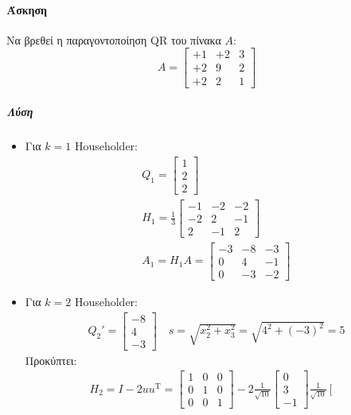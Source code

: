 \documentclass[11pt,a4paper,notitlepage,fleqn,final]{article}
\begin{document}
\paragraph{Άσκηση}
Να βρεθεί η παραγοντοποίηση QR του πίνακα \( A \):
\[
A = \left[\begin{matrix}
+1&+2&3\\+2&9&2\\+2&2&1
\end{matrix}\right]
\]
\subparagraph{Λύση}
\begin{itemize}
	\item Για \( k=1 \) Householder:
	\begin{gather*}
		Q_1 = \left[\begin{matrix}
		1\\2\\2
		\end{matrix}\right] \\
		H_1 = \frac{1}{3} \left[\begin{matrix}
		-1&-2&-2\\-2&2&-1\\2&-1&2
		\end{matrix}\right] \\
		A_1 = H_1A = \left[\begin{matrix}
		-3 & -8 & -3 \\ 0 &4 & -1 \\ 0 & -3 & -2
		\end{matrix}\right]
	\end{gather*}
	\item Για \( k=2 \) Householder:
	\begin{gather*}
		Q_2' = \left[\begin{matrix}
		-8 \\ 4 \\ -3
		\end{matrix}\right] \quad s=\sqrt{x_2^2+x_3^2}=
		\sqrt{4^2+(-3)^2}=5
	\end{gather*}
	Προκύπτει:
	\begin{gather*}
		H_2 = I-2uu^{\mathrm T} = \left[\begin{matrix}
		1 & 0 & 0 \\ 0 & 1 & 0 \\ 0 & 0 & 1
		\end{matrix}\right] -2\frac{1}{\sqrt{10}} \left[\begin{matrix}
		0\\3\\-1
		\end{matrix}\right]\frac{1}{\sqrt{10}}\left[\begin{matrix}

\end{matrix}
\end{gather*}
\end{itemize}
\end{document}
